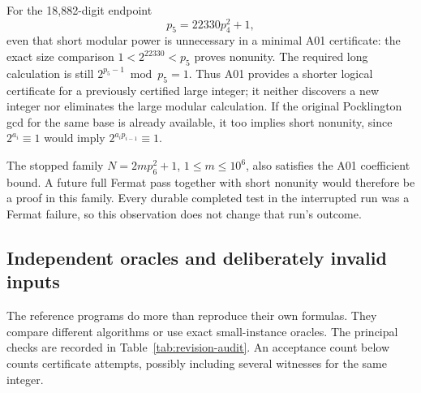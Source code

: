 \documentclass[11pt,a4paper]{article}
\theoremstyle{definition}\newtheorem{definition}[theorem]{Definition}
\theoremstyle{remark}\newtheorem{remark}[theorem]{Remark}
\begin{document}
For the 18,882-digit endpoint
\[
 p_5=22330p_4^2+1,
\]
even that short modular power is unnecessary in a minimal A01 certificate:
the exact size comparison $1<2^{22330}<p_5$ proves nonunity.
The required long calculation is still
$2^{p_5-1}\bmod p_5=1$. Thus A01 provides a shorter
logical certificate for a previously certified large integer; it neither
discovers a new integer nor eliminates the large modular calculation.
If the original Pocklington gcd for the same base is already available,
it too implies short nonunity, since
$2^{a_i}\equiv1$ would imply $2^{a_ip_{i-1}}\equiv1$.

The stopped family $N=2mp_6^2+1$, $1\le m\le10^6$, also satisfies
the A01 coefficient bound. A future full Fermat pass together with short
nonunity would therefore be a proof in this family. Every durable completed
test in the interrupted run was a Fermat failure, so this observation
does not change that run's outcome.

\subsection{Independent oracles and deliberately invalid inputs}

The reference programs do more than reproduce their own formulas.
They compare different algorithms or use exact small-instance oracles.
The principal checks are recorded in Table~\ref{tab:revision-audit}.
An acceptance count below counts certificate attempts, possibly including
several witnesses for the same integer.
\end{document}
